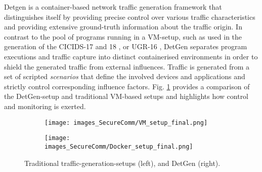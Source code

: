 Detgen is a container-based network traffic generation framework that distinguishes itself by providing precise control over various traffic characteristics and providing extensive ground-truth information about the traffic origin. %
In contrast to the pool of programs running in a VM-setup, such as used in the generation of the CICIDS-17 and 18 \cite{sharafaldin2018toward}, or UGR-16 \cite{macia2018ugr}, DetGen separates program executions and traffic capture into distinct containerised environments in order to shield the generated traffic from external influences.%
Traffic is generated from a set of scripted \textit{scenarios} that define the involved devices and applications and strictly control corresponding influence factors. 
Fig. \ref{Fig:Setup_comp} provides a comparison of the DetGen-setup and traditional VM-based setups and highlights how control and monitoring is exerted.

\begin{figure}
\centering
\begin{subfigure}[b]{0.48\textwidth}
\texttt{[image: images\_SecureComm/VM\_setup\_final.png]}
\vspace{0.0cm}
\vspace{-0.09cm}
\end{subfigure}
\begin{subfigure}[b]{0.48\textwidth}
\texttt{[image: images\_SecureComm/Docker\_setup\_final.png]}
\vspace{0.0cm}
\vspace{-0.4cm}
\end{subfigure}
\caption{Traditional traffic-generation-setups (left), and DetGen (right).}\label{Fig:Setup_comp}
\end{figure}

